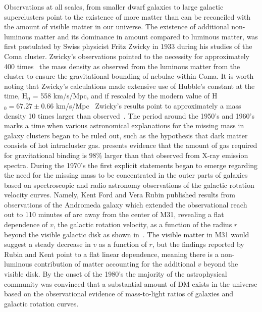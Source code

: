 Observations at all scales, from smaller dwarf galaxies to large galactic superclusters point to the existence of more matter than can be reconciled with the amount of visible matter in our universe. The existence of additional non-luminous matter and its dominance in amount compared to luminous matter, was first postulated by Swiss physicist Fritz Zwicky in 1933 during his studies of the Coma cluster. Zwicky's observations pointed to the necessity for approximately 400 times~\cite{2009GReGr} the mass density as observed from the luminous matter from the cluster to ensure the gravitational bounding of nebulae within Coma. It is worth noting that Zwicky's calculations made extensive use of Hubble's constant at the time, H$_0$ = 558 km/s/Mpc, and if rescaled by the modern value of H$_0 = 67.27 \pm 0.66$ km/s/Mpc~\cite{Ade:2015xua} Zwicky's results point to approximately a mass density 10 times larger than observed~\cite{Bertone:2016nfn}. The period around the 1950's and 1960's marks a time when various astronomical explanations for the missing mass in galaxy clusters began to be ruled out, such as the hypothesis that dark matter consists of hot intracluster gas. \cite{MEEKINS1971} presents evidence that the amount of gas required for gravitational binding is $98\%$ larger than that observed from X-ray emission spectra. During the 1970's the first explicit statements began to emerge regarding the need for the missing mass to be concentrated in the outer parts of galaxies based on spectroscopic and radio astronomy observations of the galactic rotation velocity curves. Namely, Kent Ford and Vera Rubin published results from observations of the Andromeda galaxy which extended the observational reach out to 110 minutes of arc away from the center of M31, revealing a flat dependence of $v$, the galactic rotation velocity, as a function of the radius $r$ beyond the visible galactic disk as shown in~. The visible matter in M31 would suggest a steady decrease in $v$ as a function of $r$, but the findings reported by Rubin and Kent point to a flat linear dependence, meaning there is a non-luminous contribution of matter accounting for the additional $v$ beyond the visible disk. By the onset of the 1980's the majority of the astrophysical community was convinced that a substantial amount of DM exists in the universe based on the observational evidence of mass-to-light ratios of galaxies and galactic rotation curves.

